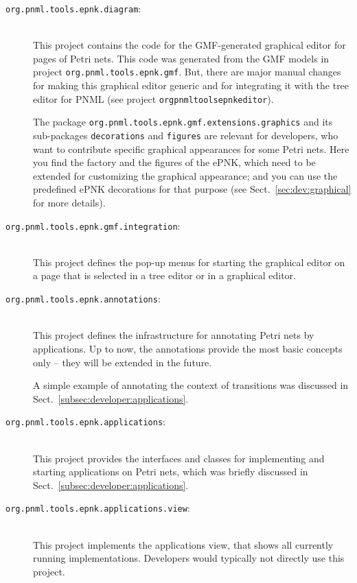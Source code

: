 \begin{description}
  \item[{\tt org.pnml.tools.epnk.diagram}:] ~\\
    This project contains the code for
    the GMF-generated graphical editor for pages of Petri nets. This code was
    generated from the GMF models in project {\tt org.pnml.tools.epnk.gmf}.
    But, there are major manual changes for making this graphical editor
    generic and for integrating it with the tree editor for PNML (see
    project {\tt org\qnsep{}pnml\qnsep{}tools\qnsep{}epnk\qnsep{}editor}).
    
    The package {\tt org.pnml.tools.epnk.gmf.extensions.graphics} and its%
    sub-packages {\tt decorations}%
    and {\tt figures}%
    are relevant for 
    developers, who want to contribute specific graphical appearances for
    some Petri nets. Here you find the factory and the figures of the ePNK,
    which need to be extended for customizing the graphical appearance;
    and you can use the predefined ePNK decorations for that purpose
    (see Sect.~\ref{sec:dev:graphical} for more details). 
    
  \item[{\tt org.pnml.tools.epnk.gmf.integration}:] ~\\
    This project defines the
    pop-up menus for starting the graphical editor on a page that is selected in
    a tree editor or in a graphical editor.
    
  \item[{\tt org.pnml.tools.epnk.annotations}:] ~\\
    This project defines the
    infrastructure for annotating Petri nets by applications. Up to now,
    the annotations%
    provide the most basic concepts only -- they will be extended in the
    future.

    A simple example of annotating the context of transitions was discussed
    in Sect.~\ref{subsec:developer:applications}.
    
  \item[{\tt org.pnml.tools.epnk.applications}:] ~\\
    This project provides the
    interfaces and classes for implementing and starting applications on Petri
    nets, which was briefly discussed in
    Sect.~\ref{subsec:developer:applications}.%
    
  \item[{\tt org.pnml.tools.epnk.applications.view}:] ~\\
    This project implements
    the applications view, that shows all currently running implementations.
    Developers would typically not directly use this project. 
\end{description}

